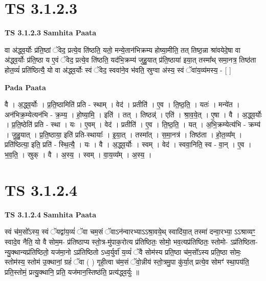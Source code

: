 \documentclass[17pt]{extarticle}
\begin{document}
\section*{ TS 3.1.2.3 }

\textbf{TS 3.1.2.3 } \newline
\textbf{Samhita Paata} \newline

वा अ॑द्ध्व॒र्योः प्र॑ति॒ष्ठां ॅवेद॒ प्रत्ये॒व ति॑ष्ठति॒ यतो॒ मन्ये॒तान॑भिक्रम्य होष्या॒मीति॒ तत् तिष्ठ॒न्ना श्रा॑वयेदे॒षा वा अ॑द्ध्व॒र्योः प्र॑ति॒ष्ठा य ए॒वं ॅवेद॒ प्रत्ये॒व ति॑ष्ठति॒ यद॑भि॒क्रम्य॑ जुहु॒यात् प्र॑ति॒ष्ठाया॑ इया॒त् तस्मा᳚थ् समा॒नत्र॒ तिष्ठ॑ता होत॒व्यं॑ प्रति॑ष्ठित्यै॒ यो वा अ॑द्ध्व॒र्योः स्वं ॅवेद॒ स्ववा॑ने॒व भ॑वति॒ स्रुग्वा अ॑स्य॒ स्वं ॅवा॑य॒व्य॑मस्य॒ - [  ] \newline

\textbf{Pada Paata} \newline

वै । अ॒द्ध्व॒र्योः । प्र॒ति॒ष्ठामिति॑ प्रति - स्थाम् । वेद॑ । प्रतीति॑ । ए॒व । ति॒ष्ठ॒ति॒ । यतः॑ । मन्ये॑त । अन॑भिक्र॒म्येत्यन॑भि - क्र॒म्य॒ । हो॒ष्या॒मि॒ । इति॑ । तत् । तिष्ठन्न्॑ । एति॑ । श्रा॒व॒ये॒त् । ए॒षा । वै । अ॒द्ध्व॒र्योः । प्र॒ति॒ष्ठेति॑ प्रति - स्था । यः । ए॒वम् । वेद॑ । प्रतीति॑ । ए॒व । ति॒ष्ठ॒ति॒ । यत् । अ॒भि॒क्रम्येत्य॑भि - क्रम्य॑ । जु॒हु॒यात् । प्र॒ति॒ष्ठाया॒ इति॑ प्रति-स्थायाः᳚ । इ॒या॒त् । तस्मा᳚त् । स॒मा॒नत्र॑ । तिष्ठ॑ता । हो॒त॒व्य᳚म् । प्रति॑ष्ठित्या॒ इति॒ प्रति॑ - स्थि॒त्यै॒ । यः । वै । अ॒द्ध्व॒र्योः । स्वम् । वेद॑ । स्ववा॒निति॒ स्व - वा॒न् । ए॒व । भ॒व॒ति॒ । स्रुक् । वै । अ॒स्य॒ । स्वम् । वा॒य॒व्य᳚म् । अ॒स्य॒ ।  \newline




\section*{ TS 3.1.2.4 }

\textbf{TS 3.1.2.4 } \newline
\textbf{Samhita Paata} \newline

स्वं च॑म॒सो᳚ऽस्य॒ स्वं ॅयद्वा॑य॒व्यं॑ ॅवा चम॒सं ॅवाऽन॑न्वारभ्याऽऽश्रा॒वये॒थ् स्वादि॑या॒त् तस्मा॑ दन्वा॒रभ्या॒ ऽऽश्राव्यꣳ॒॒ स्वादे॒व नैति॒ यो वै सोम॒म- प्र॑तिष्ठाप्य स्तो॒त्र-मु॑पाक॒रोत्य प्र॑तिष्ठितः॒ सोमो॒ भव॒त्यप्र॑तिष्ठितः॒ स्तोमो- ऽप्र॑तिष्ठिता-न्यु॒क्थान्यप्र॑तिष्ठितो॒ यज॑मा॒नो ऽप्र॑तिष्ठितो ऽध्व॒र्युर्वा॑ य॒व्यं॑ ॅवै सोम॑स्य प्रति॒ष्ठा च॑म॒सो᳚ऽस्य प्रति॒ष्ठा सोमः॒ स्तोम॑स्य॒ स्तोम॑ उ॒क्थानां॒ ग्रहं॑ ॅवा ( ) गृही॒त्वा च॑म॒सं ॅवो॒न्नीय॑ स्तो॒त्रमु॒पा कु॑र्या॒त् प्रत्ये॒व सोमꣳ॑ स्था॒पय॑ति॒ प्रति॒स्तोमं॒ प्रत्यु॒क्थानि॒ प्रति॒ यज॑मान॒स्तिष्ठ॑ति॒ प्रत्य॑द्ध्व॒र्युः ॥ \newline
\end{document}
